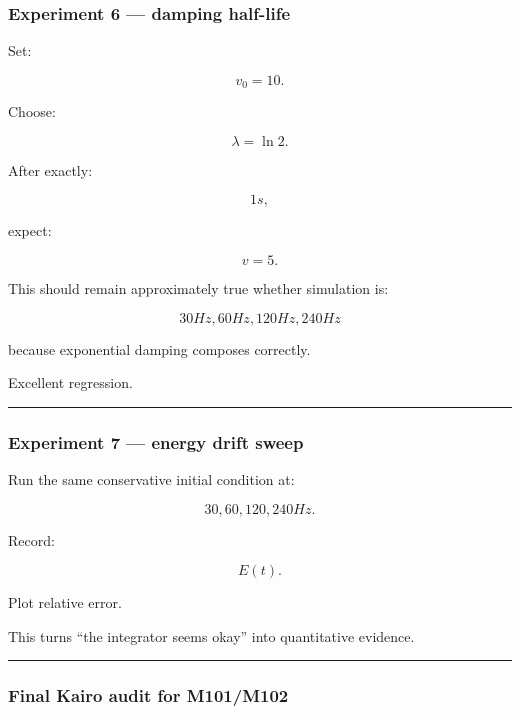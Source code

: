 \subsubsection{Experiment 6 --- damping half-life}\label{experiment-6-damping-half-life}

Set:

\[
v_0=10.
\]

Choose:

\[
\lambda=\ln2.
\]

After exactly:

\[
1s,
\]

expect:

\[
v=5.
\]

This should remain approximately true whether simulation is:

\[
30Hz,
60Hz,
120Hz,
240Hz
\]

because exponential damping composes correctly.

Excellent regression.

\begin{center}\rule{0.5\linewidth}{0.5pt}\end{center}

\subsubsection{Experiment 7 --- energy drift sweep}\label{experiment-7-energy-drift-sweep}

Run the same conservative initial condition at:

\[
30,60,120,240Hz.
\]

Record:

\[
E(t).
\]

Plot relative error.

This turns ``the integrator seems okay'' into quantitative evidence.

\begin{center}\rule{0.5\linewidth}{0.5pt}\end{center}

\subsubsection{Final Kairo audit for M101/M102}\label{final-kairo-audit-for-m101m102}

